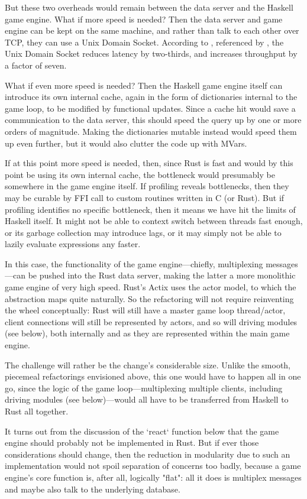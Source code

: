 But these two overheads would remain between the data server and the Haskell
game engine.
What if more speed is needed?
Then the data server and game engine can be kept on the same machine, and rather than talk to each other
over TCP, they can use a Unix Domain Socket.
According to
,
referenced by
,
the Unix Domain Socket reduces latency by two-thirds, and increases throughput
by a factor of seven.

What if even more speed is needed?
Then the Haskell game engine itself can introduce its own internal cache,
again in the form of dictionaries internal to the game loop, to be modified by
functional updates.
Since a cache hit would save a communication to the data server,
this should speed the query up by one or more orders of magnitude.
Making the dictionaries mutable instead would speed them up even further,
but it would also clutter the code up with MVars.

If at this point more speed is needed, then, since Rust is fast and would by
this point be using its own internal cache, the bottleneck would presumably be
somewhere in the game engine itself.
If profiling reveals bottlenecks,
then they may be curable by FFI call to custom routines written in C (or Rust).
But if profiling identifies no specific bottleneck, then it means we have hit
the limits of Haskell itself.
It might not be able to context switch between threads fast enough,
or its garbage collection may introduce lags, or it may simply not be able to
lazily evaluate expressions any faster.

In this case, the functionality of the game engine---chiefly, multiplexing
messages---can be pushed into the Rust data server, making the latter a more
monolithic game engine of very high speed.
Rust's Actix uses the actor model,
to which the  abstraction maps quite naturally.
So the refactoring will not require reinventing the wheel conceptually:
Rust will still have a master game loop thread/actor,
client connections will still be represented by actors,
and so will driving modules (see below),
both internally and as they are represented within the main game engine.

The challenge will rather be the change's considerable size.
Unlike the smooth, piecemeal refactorings envisioned above,
this one would have to happen all in one go,
since the logic of the game loop---multiplexing multiple clients, including
driving modules (see below)---would all have to be transferred from
Haskell to Rust all together.

It turns out from the discussion of the `react` function below that the game
engine should probably not be implemented in Rust.
But if ever those
considerations should change, then the reduction in modularity due to
such an implementation would not spoil separation of concerns too badly,
because a game engine's
core function is, after all, logically "flat": all it does is multiplex
messages and maybe also talk to the underlying database.

